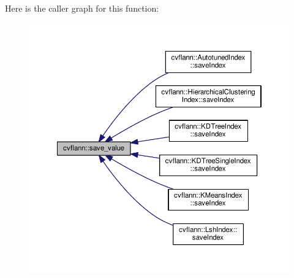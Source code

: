 Here is the caller graph for this function\-:\nopagebreak
\begin{figure}[H]
\begin{center}
\leavevmode
\includegraphics[width=350pt]{namespacecvflann_af21cc31d343e3e1132f34e11094d49a1_icgraph}
\end{center}
\end{figure}


